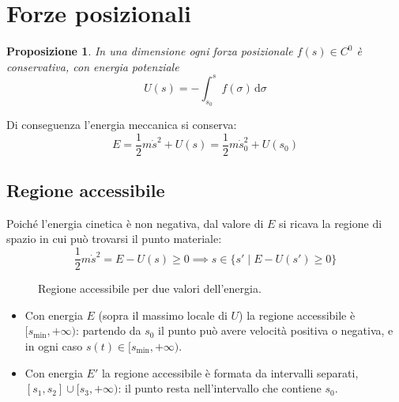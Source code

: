 \documentclass[11pt, a4paper, openright]{book}
\theoremstyle{plain}
\newtheorem{proposizione}[teorema]{Proposizione}
\theoremstyle{definition}
\theoremstyle{remark}
\begin{document}
\section{Forze posizionali}

\begin{proposizione}
    In una dimensione ogni forza posizionale $f(s) \in C^0$  è conservativa, con energia potenziale
    \begin{equation}
        U(s) = -\int_{s_0}^{s} f(\sigma)\, \mathrm{d}\sigma
    \end{equation}
\end{proposizione}

Di conseguenza l'energia meccanica si conserva:
\begin{equation}
    E = \frac{1}{2} m\dot{s}^2 + U(s) = \frac{1}{2} m\dot{s}_0^2 + U(s_0)
\end{equation}

\subsection{Regione accessibile}
Poiché l'energia cinetica è non negativa, dal valore di $E$ si ricava la regione di spazio in cui può trovarsi il punto materiale:
\begin{equation}
    \frac{1}{2} m\dot{s}^2 = E - U(s) \geq 0 \implies s \in \{ s' \mid E - U(s') \geq 0 \}
\end{equation}

\begin{figure}[H]
    \centering
    \caption{Regione accessibile per due valori dell'energia.}
\end{figure}

\begin{itemize}
    \item Con energia $E$ (sopra il massimo locale di $U$) la regione accessibile è $[s_{\min}, +\infty)$: partendo da $s_0$ il punto può avere velocità positiva o negativa, e in ogni caso $s(t) \in [s_{\min}, +\infty)$.
    \item Con energia $E'$ la regione accessibile è formata da intervalli separati, $[s_1, s_2] \cup [s_3, +\infty)$: il punto resta nell'intervallo che contiene $s_0$.
\end{itemize}
\end{document}
